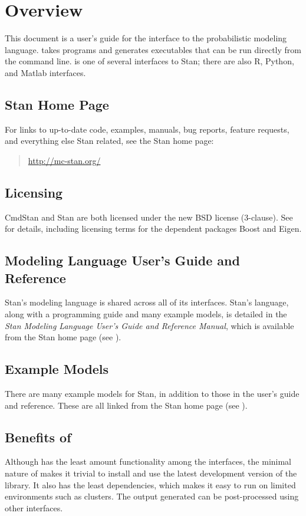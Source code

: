 \chapter{Overview}

\noindent
This document is a user's guide for the \CmdStan interface to the
\Stan probabilistic modeling language. \CmdStan takes \Stan programs
and generates executables that can be run directly from the command
line. \CmdStan is one of several interfaces to Stan; there are also R,
Python, and Matlab interfaces.

\section{Stan Home Page}\label{home-page.section}

For links to up-to-date code, examples, manuals, bug reports, feature
requests, and everything else Stan related, see the Stan home page:
%
\begin{quote}
\url{http://mc-stan.org/}
\end{quote}


\section{Licensing}

CmdStan and Stan are both licensed under the new BSD license
(3-clause). See  for details, including
licensing terms for the dependent packages Boost and Eigen.


\section{Modeling Language User's Guide and Reference}

Stan's modeling language is shared across all of its interfaces.
Stan's language, along with a programming guide and many example
models, is detailed in the {\it Stan Modeling Language User's Guide
  and Reference Manual}, which is available from the Stan home page
(see ).

\section{Example Models}

There are many example models for Stan, in addition to those in the
user's guide and reference. These are all linked from the Stan home
page (see ).


\section{Benefits of \CmdStan}

Although \CmdStan has the least amount functionality among the \Stan
interfaces, the minimal nature of \CmdStan makes it trivial to install
and use the latest development version of the \Stan library. It also
has the least dependencies, which makes it easy to run on limited
environments such as clusters. The output generated can be post-processed
using other interfaces.
